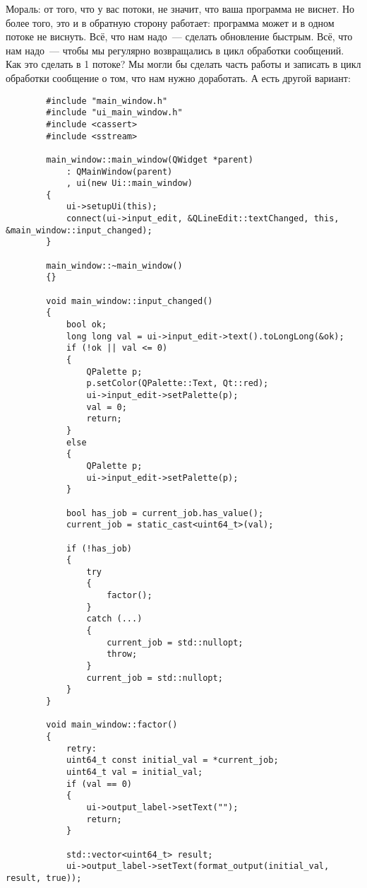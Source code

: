 \documentclass{article}
\begin{document}
    Мораль: от того, что у вас потоки, не значит, что ваша программа не виснет. Но более того, это и в обратную сторону работает: программа может и в одном потоке не виснуть. Всё, что нам надо~--- сделать обновление быстрым. Всё, что нам надо~--- чтобы мы регулярно возвращались в цикл обработки сообщений. Как это сделать в 1 потоке? Мы могли бы сделать часть работы и записать в цикл обработки сообщение о том, что нам нужно доработать. А есть другой вариант:
    \begin{verbatim}
        #include "main_window.h"
        #include "ui_main_window.h"
        #include <cassert>
        #include <sstream>
        
        main_window::main_window(QWidget *parent)
            : QMainWindow(parent)
            , ui(new Ui::main_window)
        {
            ui->setupUi(this);
            connect(ui->input_edit, &QLineEdit::textChanged, this, &main_window::input_changed);
        }
        
        main_window::~main_window()
        {}
        
        void main_window::input_changed()
        {
            bool ok;
            long long val = ui->input_edit->text().toLongLong(&ok);
            if (!ok || val <= 0)
            {
                QPalette p;
                p.setColor(QPalette::Text, Qt::red);
                ui->input_edit->setPalette(p);
                val = 0;
                return;
            }
            else
            {
                QPalette p;
                ui->input_edit->setPalette(p);
            }
            
            bool has_job = current_job.has_value();
            current_job = static_cast<uint64_t>(val);
            
            if (!has_job)
            {
                try
                {
                    factor();
                }
                catch (...)
                {
                    current_job = std::nullopt;
                    throw;
                }
                current_job = std::nullopt;
            }
        }
        
        void main_window::factor()
        {
            retry:
            uint64_t const initial_val = *current_job;
            uint64_t val = initial_val;
            if (val == 0)
            {
                ui->output_label->setText("");
                return;
            }
            
            std::vector<uint64_t> result;
            ui->output_label->setText(format_output(initial_val, result, true));
            

\end{verbatim}
\end{document}
